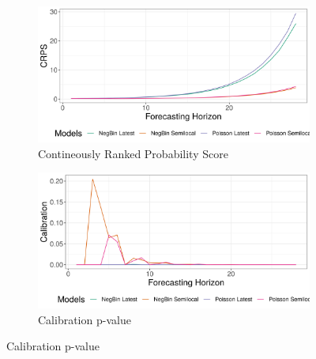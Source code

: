 \begin{figure}[H]
\begin{subfigure}{0.5\textwidth}
  \centering
  \includegraphics[width=\linewidth]{../output/Lubero_crps.png}  
  \caption{Contineously Ranked Probability Score}
  \label{fig:sub-first}
\end{subfigure}
\begin{subfigure}{0.5\textwidth}
  \centering
  \includegraphics[width=\linewidth]{../output/Lubero_calibration.png}  
  \caption{Calibration p-value}
  \label{fig:sub-second}
\end{subfigure}


\end{figure}
